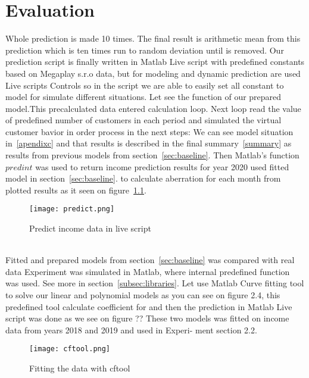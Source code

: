 \chapter{Evaluation} \label{evaluation}
Whole prediction is made 10 times. The final result is arithmetic mean from this prediction which is ten times run to random deviation until is removed.
Our prediction script is finally written in Matlab Live script with predefined constants based on Megaplay s.r.o data,
    but for modeling and dynamic prediction are used Live scripts Controls so in the script we are able to easily set all constant to model for simulate different situations.
    Let see the function of our prepared model.This precalculated data entered calculation loop.
Next loop read the value of predefined number of customers in each period and simulated the virtual customer bavior in order process in the next steps:
We can see model situation in~\ref{apendixc} and that results is described in the final summary~\ref{summary} as results from previous models from section~\ref{sec:baseline}.
Then Matlab's function $predint$ was used to return income prediction results for year 2020 used fitted model in section~\ref{sec:baseline}.
to calculate aberration for each month from plotted results as it seen on figure~\ref{predict}.
\begin{figure}[h!]
    \begin{center}
        \texttt{[image: predict.png]}
    \end{center}
    \caption{Predict income data in live script~\cite{luarn}}
    \label{predict}
\end{figure}\\
Fitted and prepared models from section~\ref{sec:baseline} was compared with real data
Experiment was simulated in Matlab, where internal predefined function was used.
See more in section~\ref{subsec:libraries}.
Let use Matlab Curve fitting tool to solve our linear and polynomial models as you can see on figure 2.4, this predefined tool calculate coefficient for and then the prediction in Matlab Live script was done as we see on figure ?? These two models was fitted on income data from years 2018 and 2019 and used in Experi- ment section 2.2.
\begin{figure}[h!]
    \begin{center}
        \texttt{[image: cftool.png]}
    \end{center}
    \caption{Fitting the data with cftool~\cite{luarn}}
    \label{cftool}
\end{figure}\\



